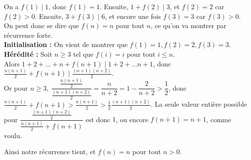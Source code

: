 \begin{sol}
On a $f(1)\mid 1$, donc $f(1)=1$. Ensuite, $1+f(2)\mid 3$, et $f(2)=2$ car $f(2)>0$. Ensuite, $3+f(3)\mid 6$, et encore une fois $f(3)=3$ car $f(3)>0$. On peut donc se dire que $f(n)=n$ pour tout $n$, ce qu'on va montrer par récurrence forte.\\
\textbf{Initialisation :} On vient de montrer que $f(1)=1,f(2)=2,f(3)=3$.\\
\textbf{Hérédité :} Soit $n\ge 3$ tel que $f(i)=i$ pour tout $i\le n$.\\ Alors $1+2+\dots+n+f(n+1)\mid 1+2+\dots n+1$, donc $\frac{n(n+1)}2+f(n+1)\mid \frac{(n+1)(n+2)}2$. \\
Or pour $n\ge 3,\:\dfrac{\frac{n(n+1)}2}{\frac{(n+1)(n+2)}2}=\dfrac n{n+2}=1-\dfrac2{n+2}>\dfrac12$, donc $\frac{n(n+1)}2+f(n+1)>\frac{n(n+1)}2>\frac12\frac{(n+1)(n+2)}2$. La seule valeur entière possible pour $\dfrac{\frac{(n+1)(n+2)}2}{\frac{n(n+1)}2+f(n+1)}$ est donc $1$, ou encore $f(n+1)=n+1$, comme voulu.

Ainsi notre récurrence tient, et $f(n)=n$ pour tout $n>0$.
\end{sol}